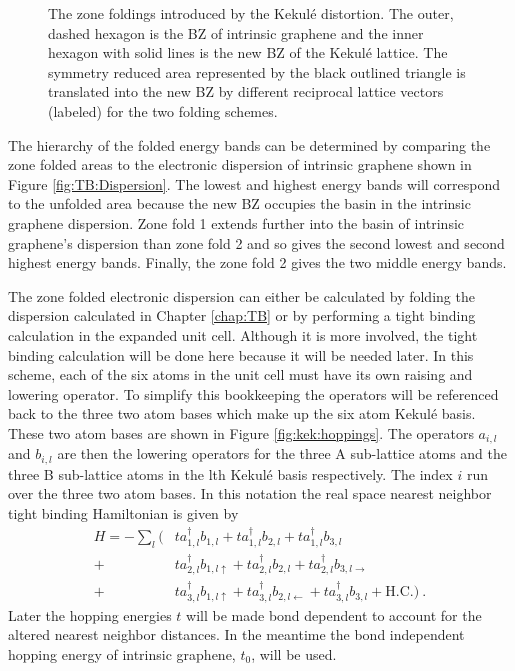 \begin{figure}
	\begin{center}
	
	\end{center}
	\caption[The zone foldings introduced by the Kekul\'e distortion]{\label{fig:kek:folding}
		The zone foldings introduced by the Kekul\'e distortion.
		The outer, dashed hexagon is the BZ of intrinsic graphene and the inner hexagon with solid lines is the new BZ of the Kekul\'e lattice.
		The symmetry reduced area represented by the black outlined triangle is translated into the new BZ by different reciprocal lattice vectors (labeled) for the two folding schemes.
		}
\end{figure}

The hierarchy of the folded energy bands can be determined by comparing the zone folded areas to the electronic dispersion of intrinsic graphene shown in Figure \ref{fig:TB:Dispersion}.
The lowest and highest energy bands will correspond to the unfolded area because the new BZ occupies the basin in the intrinsic graphene dispersion.
Zone fold 1 extends further into the basin of intrinsic graphene's dispersion than zone fold 2 and so gives the second lowest and second highest energy bands.
Finally, the zone fold 2 gives the two middle energy bands.

The zone folded electronic dispersion can either be calculated by folding the dispersion calculated in Chapter \ref{chap:TB} or by performing a tight binding calculation in the expanded unit cell.
Although it is more involved, the tight binding calculation will be done here because it will be needed later.
In this scheme, each of the six atoms in the unit cell must have its own raising and lowering operator.
To simplify this bookkeeping the operators will be referenced back to the three two atom bases which make up the six atom Kekul\'e basis.
These two atom bases are shown in Figure \ref{fig:kek:hoppings}.
The operators $a_{i,l}$ and $b_{i,l}$ are then the lowering operators for the three A sub-lattice atoms and the three B sub-lattice atoms in the lth Kekul\'e basis respectively.
The index $i$ run over the three two atom bases.
In this notation the real space nearest neighbor tight binding Hamiltonian is given by
\newcommand{\rl}[4]{
	a^{\dagger}_{#1,#2} b_{#3,#4}
}
\begin{align}
	H=-\sum_l (
		 & t \rl{1}{l}{1}{l        }+t\rl{1}{l}{2}{l          }+t\rl{1}{l}{3}{l           } \nonumber \\
		+& t \rl{2}{l}{1}{l\uparrow}+t\rl{2}{l}{2}{l          }+t\rl{2}{l}{3}{l\rightarrow} \nonumber \\ 
		+& t \rl{3}{l}{1}{l\uparrow}+t\rl{3}{l}{2}{l\leftarrow}+t\rl{3}{l}{3}{l           } + \text{H.C.} ) \ .
		\label{eq:kek:Hreal}
\end{align}
Later the hopping energies $t$ will be made bond dependent to account for the altered nearest neighbor distances.
In the meantime the bond independent hopping energy of intrinsic graphene, $t_0$, will be used.

